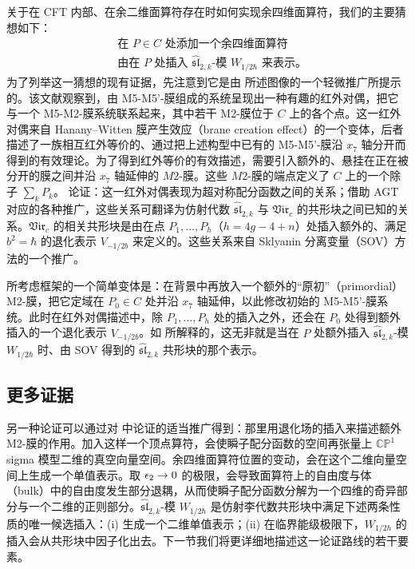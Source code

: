 关于在 CFT 内部、在余二维面算符存在时如何实现余四维面算符，我们的主要猜想如下：
\begin{equation}\label{Heckeconj}
\boxed{ 
\quad
\begin{aligned}
&\text{在 $P\in C$ 处添加一个余四维面算符}\\
& \text{由在 $P$ 处插入 $\widehat{\mathfrak{sl}}_{2,k}$-模 $W_{1/2\hbar}$ 来表示。}
\end{aligned}
\quad
}
\end{equation}
为了列举这一猜想的现有证据，先注意到它是由 \cite{FGT} 所述图像的一个轻微推广所提示的。该文献观察到，由 M5-M5'-膜组成的系统呈现出一种有趣的红外对偶，把它与一个 M5-M2-膜系统联系起来，其中若干 M2-膜位于 $C$ 上的各个点。这一红外对偶来自 Hanany--Witten 膜产生效应（brane creation effect）的一个变体，后者描述了一族相互红外等价的、通过把上述构型中已有的 M5-M5'-膜沿 $x_7$ 轴分开而得到的有效理论。为了得到红外等价的有效描述，需要引入额外的、悬挂在正在被分开的膜之间并沿 $x_7$ 轴延伸的 $M2$-膜。这些 $M2$-膜的端点定义了 $C$ 上的一个除子 $\sum_{k}P_k$。\cite{FGT} 论证：这一红外对偶表现为超对称配分函数之间的关系；借助 AGT 对应的各种推广，这些关系可翻译为仿射代数 $\widehat{\mathfrak{sl}}_{2,k}$ 与 $\mathfrak{Vir}_c$ 的共形块之间已知的关系。$\mathfrak{Vir}_c$ 的相关共形块是由在点 $P_1,\dots,P_h$（$h=4g-4+n$）处插入额外的、满足 $b^2=\hbar$ 的退化表示 $V_{-1/2b}$ 来定义的。这些关系来自 Sklyanin 分离变量（SOV）方法的一个推广。

\cite{FGT} 所考虑框架的一个简单变体是：在背景中再放入一个额外的“原初”（primordial）M2-膜，把它定域在 $P_0\in C$ 处并沿 $x_7$ 轴延伸，以此修改初始的 M5-M5'-膜系统。此时在红外对偶描述中，除 $P_1,\dots,P_h$ 处的插入之外，还会在 $P_0$ 处得到额外插入的一个退化表示 $V_{-1/2b}$。如 \cite{T10} 所解释的，这无非就是当在 $P$ 处额外插入 $\widehat{\mathfrak{sl}}_{2,k}$-模 $W_{1/2\hbar}$ 时、由 SOV 得到的 $\widehat{\mathfrak{sl}}_{2,k}$ 共形块的那个表示。

\subsection{更多证据}

另一种论证可以通过对 \cite{AGGTV} 中论证的适当推广得到：那里用退化场的插入来描述额外 M2-膜的作用。加入这样一个顶点算符，会使瞬子配分函数的空间再张量上 $\mathbb{CP}^1$ sigma 模型二维的真空向量空间。余四维面算符位置的变动，会在这个二维向量空间上生成一个单值表示。取 $\epsilon_2\to 0 $ 的极限，会导致面算符上的自由度与体（bulk）中的自由度发生部分退耦，从而使瞬子配分函数分解为一个四维的奇异部分与一个二维的正则部分。$\widehat{\mathfrak{sl}}_{2,k}$-模 $W_{1/2\hbar}$ 是仿射李代数共形块中满足下述两条性质的唯一候选插入：(i) 生成一个二维单值表示；(ii) 在临界能级极限下，$W_{1/2\hbar}$ 的插入会从共形块中因子化出去。下一节我们将更详细地描述这一论证路线的若干要素。

